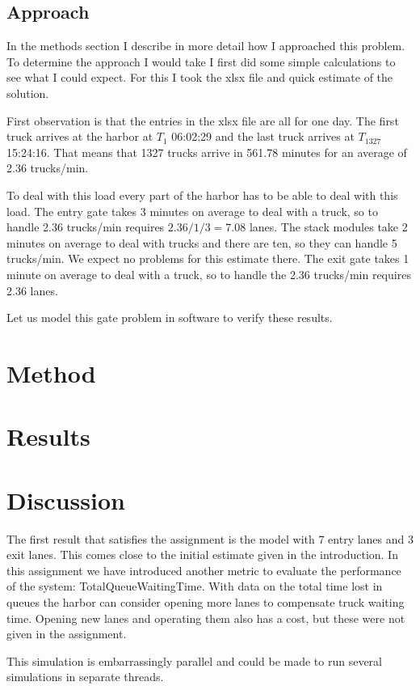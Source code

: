 \documentclass{article}
\begin{document}
\subsection{Approach}

In the methods section I describe in more detail how I approached this
problem. To determine the approach I would take I first did some
simple calculations to see what I could expect. For this I took the
xlsx file and quick estimate of the solution.

First observation is that the entries in the xlsx file are all for one
day. The first truck arrives at the harbor at $T_1$ 06:02:29 and the
last truck arrives at $T_{1327}$ 15:24:16. That means that 1327 trucks
arrive in 561.78 minutes for an average of 2.36 trucks/min.

To deal with this load every part of the harbor has to be able to deal
with this load. The entry gate takes 3 minutes on average to deal with
a truck, so to handle 2.36 trucks/min requires $2.36 / 1/3 = 7.08$
lanes. The stack modules take 2 minutes on average to deal with trucks
and there are ten, so they can handle 5 trucks/min. We expect no
problems for this estimate there. The exit gate takes 1 minute on
average to deal with a truck, so to handle the 2.36 trucks/min
requires 2.36 lanes.

Let us model this gate problem in software to verify these results.

\section{Method}



\section{Results}


\section{Discussion}

The first result that satisfies the assignment is the model with 7
entry lanes and 3 exit lanes. This comes close to the initial estimate
given in the introduction. In this assignment we have introduced
another metric to evaluate the performance of the system:
TotalQueueWaitingTime. With data on the total time lost in queues the
harbor can consider opening more lanes to compensate truck waiting
time. Opening new lanes and operating them also has a cost, but these
were not given in the assignment.

This simulation is embarrassingly parallel and could be made to run
several simulations in separate threads.
\end{document}
